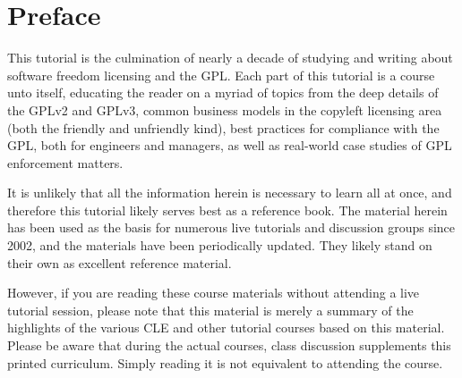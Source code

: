 \documentclass[10pt, letterpaper]{book}
\begin{document}
\tableofcontents

\chapter{Preface}

This tutorial is the culmination of nearly a decade of studying and writing
about software freedom licensing and the GPL\@.  Each part of this tutorial
is a course unto itself, educating the reader on a myriad of topics from the
deep details of the GPLv2 and GPLv3, common business models in the copyleft
licensing area (both the friendly and unfriendly kind), best practices for
compliance with the GPL, both for engineers and managers, as well as
real-world case studies of GPL enforcement matters.

It is unlikely that all the information herein is necessary to learn all at
once, and therefore this tutorial likely serves best as a reference book.
The material herein has been used as the basis for numerous live tutorials
and discussion groups since 2002, and the materials have been periodically
updated.   They likely stand on their own as excellent reference material.

However, if you are reading these course materials without attending a live
tutorial session, please note that this material is merely a summary of the
highlights of the various CLE and other tutorial courses based on this
material.  Please be aware that during the actual courses, class discussion
supplements this printed curriculum.  Simply reading it is not equivalent to
attending the course.

\mainmatter







\appendix


\end{document}
